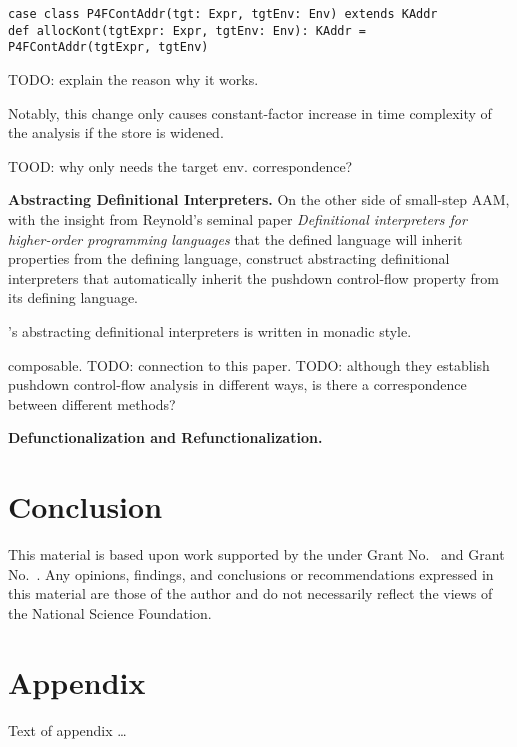 \documentclass[acmsmall,review,anonymous]{acmart}\settopmatter{printfolios=true,printccs=false,printacmref=false}
\begin{document}
\begin{lstlisting}
case class P4FContAddr(tgt: Expr, tgtEnv: Env) extends KAddr
def allocKont(tgtExpr: Expr, tgtEnv: Env): KAddr = P4FContAddr(tgtExpr, tgtEnv)
\end{lstlisting}

TODO: explain the reason why it works.

Notably, this change only causes constant-factor increase in time complexity of 
the analysis if the store is widened.

TOOD: why only needs the target env. correspondence?

\textbf{Abstracting Definitional Interpreters.}
On the other side of small-step AAM, with the insight from Reynold's seminal paper 
\emph{Definitional interpreters for higher-order programming languages} \cite{reynolds1972definitional}
that the defined language will inherit properties from the defining language, 
\citeauthor{darais2017abstracting} construct abstracting 
definitional interpreters that automatically inherit the pushdown control-flow 
property from its defining language.

\citeauthor{darais2017abstracting}'s abstracting definitional interpreters is written
in monadic style.

composable.
TODO: connection to this paper.
TODO: although they establish pushdown control-flow analysis in different ways, 
is there a correspondence between different methods?

\textbf{Defunctionalization and Refunctionalization.}

\section{Conclusion}

\begin{acks}                            %
  This material is based upon work supported by the
   under Grant
  No.~ and Grant
  No.~.  Any opinions, findings, and
  conclusions or recommendations expressed in this material are those
  of the author and do not necessarily reflect the views of the
  National Science Foundation.
\end{acks}



\appendix
\section{Appendix}

Text of appendix \ldots
\end{document}
